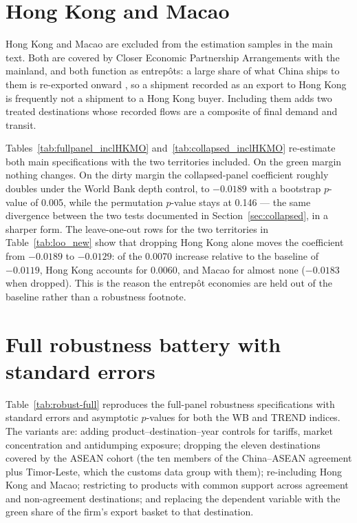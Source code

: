 \documentclass[12pt]{article}
\begin{document}
\section{Hong Kong and Macao}\label{app:hkmo}

Hong Kong and Macao are excluded from the estimation samples in the main text. Both are covered by
Closer Economic Partnership Arrangements with the mainland, and both function as entrep\^ots: a large
share of what China ships to them is re-exported onward \citep{feenstra2004}, so a shipment recorded as
an export to Hong Kong is frequently not a shipment to a Hong Kong buyer. Including them adds two
treated destinations whose recorded flows are a composite of final demand and transit.

Tables~\ref{tab:fullpanel_inclHKMO} and~\ref{tab:collapsed_inclHKMO} re-estimate both main
specifications with the two territories included. On the green margin nothing changes. On the dirty
margin the collapsed-panel coefficient roughly doubles under the World Bank depth control, to
$-0.0189$ with a bootstrap $p$-value of 0.005, while the permutation $p$-value stays at 0.146 --- the
same divergence between the two tests documented in Section~\ref{sec:collapsed}, in a sharper form.
The leave-one-out rows for the two territories in Table~\ref{tab:loo_new} show that dropping Hong Kong
alone moves the coefficient from $-0.0189$ to $-0.0129$: of the 0.0070 increase relative to the
baseline of $-0.0119$, Hong Kong accounts for 0.0060, and Macao for almost none ($-0.0183$ when
dropped). This is the reason the entrep\^ot economies are held out of the baseline rather than a
robustness footnote.





\section{Full robustness battery with standard errors}\label{app:robustfull}

Table~\ref{tab:robust-full} reproduces the full-panel robustness specifications with standard errors and asymptotic $p$-values for both the WB and TREND indices. The variants are: adding product--destination--year controls for tariffs, market concentration and antidumping exposure; dropping the eleven destinations covered by the ASEAN cohort (the ten members of the China--ASEAN agreement plus Timor-Leste, which the customs data group with them); re-including Hong Kong and Macao; restricting to products with common support across agreement and non-agreement destinations; and replacing the dependent variable with the green share of the firm's export basket to that destination.
\end{document}
